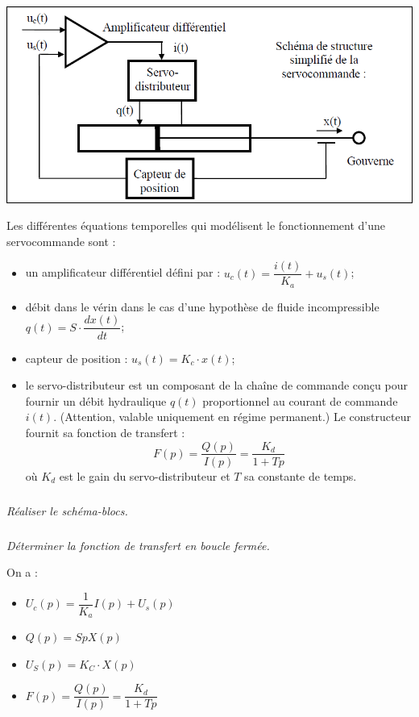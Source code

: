 \documentclass[10pt,fleqn]{article} %
\begin{document}
\begin{multicols}{2}
\setcounter{exo}{0}
\begin{center}
\includegraphics[width=.9\linewidth]{images/img5}
\end{center}

Les différentes équations temporelles qui modélisent le fonctionnement d'une servocommande sont :
\begin{itemize}
\item un amplificateur différentiel défini par : $u_c(t)=\dfrac{i(t)}{K_a}+u_s(t)$;
\item débit dans le vérin dans le cas d'une hypothèse de fluide incompressible $q(t)=S\cdot\dfrac{dx(t)}{dt}$;
\item capteur de position : $u_s(t)=K_c\cdot x(t)$;
\item le servo-distributeur est un composant de la chaîne de commande conçu pour fournir un débit hydraulique $q(t)$ proportionnel au courant de commande $i(t)$. (Attention, valable uniquement en régime permanent.) Le constructeur fournit sa fonction de transfert :
$$
F(p)=\dfrac{Q(p)}{I(p)}=\dfrac{K_d}{1+Tp}
$$
où $K_d$ est le gain du servo-distributeur et $T$ sa constante de temps.
\end{itemize}

\subparagraph{}
\textit{Réaliser le schéma-blocs.}

\subparagraph{}
\textit{Déterminer la fonction de transfert en boucle fermée.}

\ifprof

\begin{corrige}
On a :
\begin{itemize}
\item $U_c(p)=\dfrac{1}{K_a}I(p)+U_s(p)$
\item $Q(p)=SpX(p)$
\item $U_S(p)=K_C\cdot X(p)$
\item $F(p)=\dfrac{Q(p)}{I(p)}=\dfrac{K_d}{1+Tp}$
\end{itemize}



\end{corrige}
\end{multicols}
\end{document}
